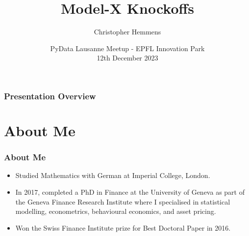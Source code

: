 \documentclass[
	11pt, %
]{beamer}
\title[Model-X Knockoffs]{Model-X Knockoffs} %
\author[Chris Hemmens]{Christopher Hemmens} %
\institute[]{\textit{chris@christopherhemmens.com}} %
\date[12.12.2023]{PyData Lausanne Meetup - EPFL Innovation Park \\ 12th December 2023} %
\begin{document}

\begin{frame}
	\titlepage %
\end{frame}



\begin{frame}
	\frametitle{Presentation Overview} %
	
	\tableofcontents %
\end{frame}


\section{About Me}

\begin{frame}
	\frametitle{About Me}
	
	\begin{itemize}
		\item Studied Mathematics with German at Imperial College, London.
		\item In 2017, completed a PhD in Finance at the University of Geneva as part of the Geneva Finance Research Institute where I specialised in statistical modelling, econometrics, behavioural economics, and asset pricing.
		\item Won the Swiss Finance Institute prize for Best Doctoral Paper in 2016.
	\end{itemize}
\end{frame}
\end{document}
